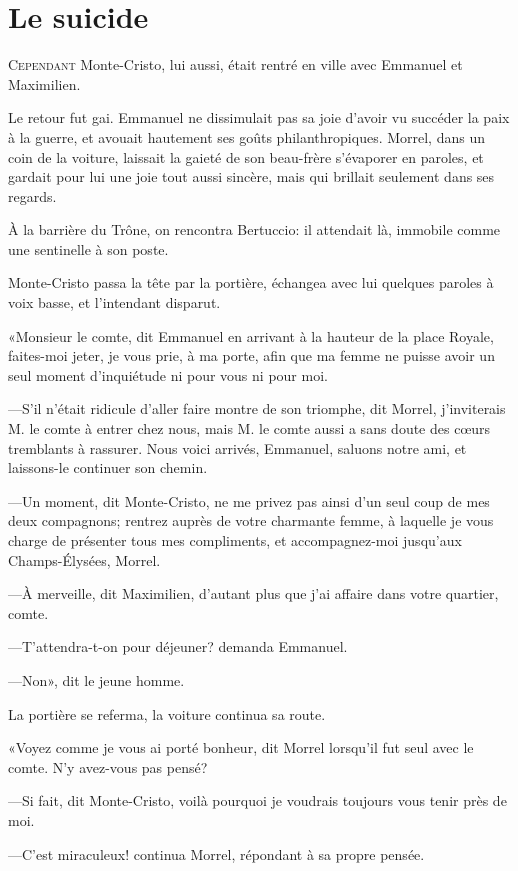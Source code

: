 \chapter{Le suicide}

\lettrine{C}{ependant} Monte-Cristo, lui aussi, était rentré en ville avec Emmanuel et Maximilien. 

\zz
Le retour fut gai. Emmanuel ne dissimulait pas sa joie d'avoir vu succéder la paix à la guerre, et avouait hautement ses goûts philanthropiques. Morrel, dans un coin de la voiture, laissait la gaieté de son beau-frère s'évaporer en paroles, et gardait pour lui une joie tout aussi sincère, mais qui brillait seulement dans ses regards. 

À la barrière du Trône, on rencontra Bertuccio: il attendait là, immobile comme une sentinelle à son poste. 

Monte-Cristo passa la tête par la portière, échangea avec lui quelques paroles à voix basse, et l'intendant disparut. 

«Monsieur le comte, dit Emmanuel en arrivant à la hauteur de la place Royale, faites-moi jeter, je vous prie, à ma porte, afin que ma femme ne puisse avoir un seul moment d'inquiétude ni pour vous ni pour moi. 

—S'il n'était ridicule d'aller faire montre de son triomphe, dit Morrel, j'inviterais M. le comte à entrer chez nous, mais M. le comte aussi a sans doute des cœurs tremblants à rassurer. Nous voici arrivés, Emmanuel, saluons notre ami, et laissons-le continuer son chemin. 

—Un moment, dit Monte-Cristo, ne me privez pas ainsi d'un seul coup de mes deux compagnons; rentrez auprès de votre charmante femme, à laquelle je vous charge de présenter tous mes compliments, et accompagnez-moi jusqu'aux Champs-Élysées, Morrel. 

—À merveille, dit Maximilien, d'autant plus que j'ai affaire dans votre quartier, comte. 

—T'attendra-t-on pour déjeuner? demanda Emmanuel. 

—Non», dit le jeune homme. 

La portière se referma, la voiture continua sa route. 

«Voyez comme je vous ai porté bonheur, dit Morrel lorsqu'il fut seul avec le comte. N'y avez-vous pas pensé? 

—Si fait, dit Monte-Cristo, voilà pourquoi je voudrais toujours vous tenir près de moi. 

—C'est miraculeux! continua Morrel, répondant à sa propre pensée. 

